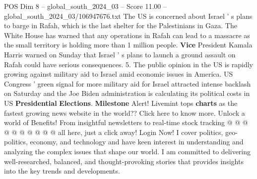 \begin{textsample}{POS Dim 8 – global\_south\_2024\_03 – Score 11.00 – global\_south\_2024\_03/106947676.txt}
The US is concerned about Israel ' s plans to barge in Rafah, which is the last shelter for the Palestinians in Gaza.
The White House has warned that any operations in Rafah can lead to a massacre as the small territory is holding more than 1 million people. \textbf{Vice} President Kamala Harris warned on Sunday that Israel ' s plans to launch a ground assault on Rafah could have serious consequences. 5.
The public opinion in the US is rapidly growing against military aid to Israel amid economic issues in America.
US Congress ' green signal for more military aid for Israel attracted intense backlash on Saturday and the Joe Biden administration is calculating its political costs in US \textbf{Presidential} \textbf{Elections}. \textbf{Milestone} Alert!
Livemint tops \textbf{charts} as the fastest growing news website in the world??
Click here to know more.
Unlock a world of Benefits!
From insightful newsletters to real-time stock tracking @ @ @ @ @ @ @ @ @ @ all here, just a click away!
Login Now!
I cover politics, geo-politics, economy, and technology and have keen interest in understanding and analyzing the complex issues that shape our world.
I am committed to delivering well-researched, balanced, and thought-provoking stories that provides insights into the key trends and developments.

\end{textsample}
